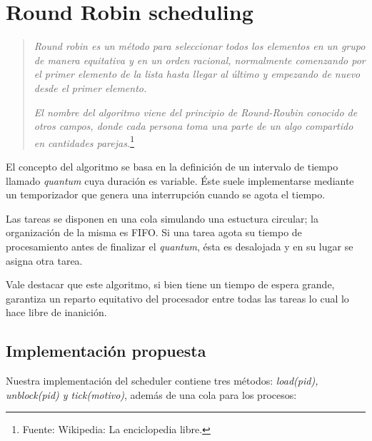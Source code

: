 \section{Round Robin scheduling}

\begin{quote}
	\textit{Round robin es un método para seleccionar todos los elementos en un grupo de manera equitativa y en un orden racional, normalmente comenzando por el primer elemento de la lista hasta llegar al último y empezando de nuevo desde el primer elemento.} 
	
	\textit{El nombre del algoritmo viene del principio de Round-Roubin conocido de otros campos, donde cada persona toma una parte de un algo compartido en cantidades parejas.}\footnote{Fuente: Wikipedia: La enciclopedia libre.}
	
\end{quote}
	
	El concepto del algoritmo se basa en la definición de un intervalo de tiempo llamado \textit{quantum} cuya duración es variable. Éste suele implementarse mediante un temporizador que genera una interrupción cuando se agota el tiempo.
	
	Las tareas se disponen en una cola simulando una estuctura circular; la organización de la misma es FIFO. Si una tarea agota su tiempo de procesamiento antes de finalizar el \textit{quantum}, ésta es desalojada y en su lugar se asigna otra tarea.
	
	Vale destacar que este algoritmo, si bien tiene un tiempo de espera grande, garantiza un reparto equitativo del procesador entre todas las tareas lo cual lo hace libre de inanición.

\subsection{Implementación propuesta}

Nuestra implementación del scheduler contiene tres métodos: \textit{load(pid), unblock(pid) y tick(motivo)}, además de una cola para los procesos:

